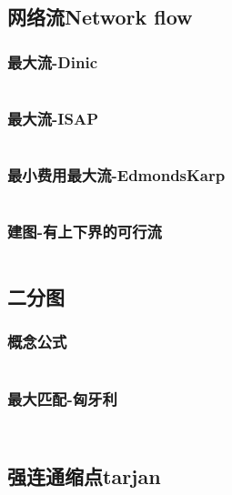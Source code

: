 \documentclass[twoside,sub3section,UTF8]{ctexart}						%
\begin{document}
	\subsection{网络流Network flow}
		\subsubsection{最大流-Dinic}
		\inputminted{c++}{"Gragh Theory/Network Flow/dinic.cpp"}
		\subsubsection{最大流-ISAP}
		\inputminted{c++}{"Gragh Theory/Network Flow/ISAP.cpp"}
		\subsubsection{最小费用最大流-EdmondsKarp}
		\inputminted{c++}{"Gragh Theory/Network Flow/MCMF.cpp"}
		\subsubsection{建图-有上下界的可行流}
		\inputminted{c++}{"Gragh Theory/Network Flow/lowup.cpp"}

	\subsection{二分图}
		\subsubsection{概念公式}
		\inputminted{c++}{"Gragh Theory/Bipartite gragh/emmm.cpp"}
		\subsubsection{最大匹配-匈牙利}
			\inputminted{c++}{"Gragh Theory/Bipartite gragh/hungary.cpp"}
			\inputminted{c++}{"Gragh Theory/Bipartite gragh/hungarymatrix.cpp"}

	\subsection{强连通缩点tarjan}
	\inputminted{c++}{"Gragh Theory/SCC.cpp"}
\end{document}
